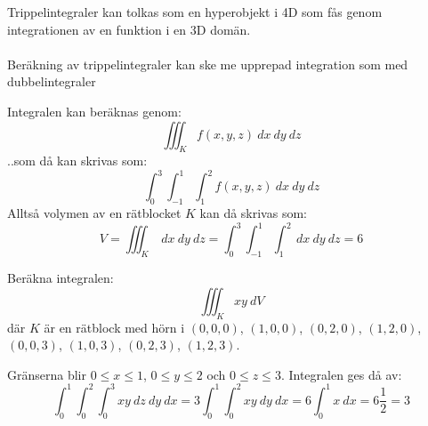 \documentclass{report}
\begin{document}
\vspace{20pt}
{
Trippelintegraler kan tolkas som en hyperobjekt i 4D som fås genom integrationen av en funktion i en 3D domän.\\\\

Beräkning av trippelintegraler kan ske me upprepad integration som med dubbelintegraler
}

{
Integralen kan beräknas genom:
\begin{equation*}
\iiint_{K}^{} f(x,y,z) \: dx  \: dy  \: dz 
\end{equation*}
..som då kan skrivas som:
\begin{equation*}
\int_{0}^{3} \int_{-1}^{1} \int_{1}^{2} f(x,y,z) \: dx \: dy  \: dz 
\end{equation*}
Alltså volymen av en rätblocket $ K $ kan då skrivas som:
\begin{equation*}
V = \iiint_{K}^{}  \: dx  \: dy  \: dz = \int_{0}^{3} \int_{-1}^{1} \int_{1}^{2}  \: dx  \: dy  \: dz  = 6  
\end{equation*}
}

\vspace{20pt}
\qs{}
{
Beräkna integralen:
\begin{equation*}
\iiint_{K}^{} xy \: dV
\end{equation*}
där $ K $ är en rätblock med hörn i $ (0,0,0) $, $ (1,0,0) $, $ (0,2,0) $, $ (1,2,0) $, $ (0,0,3) $, $ (1,0,3) $, $ (0,2,3) $, $ (1,2,3) $.
}

\sol Gränserna blir $ 0 \le x \le 1 $, $ 0 \le y \le 2 $ och $ 0 \le z \le 3 $. Integralen ges då av:
\begin{equation*}
\int_{0}^{1} \int_{0}^{2} \int_{0}^{3} xy \: dz  \: dy  \: dx = 3 \int_{0}^{1} \int_{0}^{2} xy \: dy  \: dx = 6 \int_{0}^{1} x \: dx = 6 \frac{1}{2} = 3  
\end{equation*}
\vspace{20pt}

\end{document}
